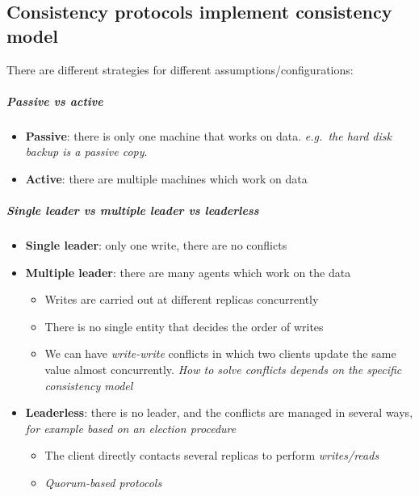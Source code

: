 \subsection{Consistency protocols implement consistency model}

There are different strategies for different assumptions/configurations:

\subparagraph{Passive vs active}

\begin{itemize}
    \item
      \textbf{Passive}: there is only one machine that works on data.
      \emph{e.g.~the hard disk backup is a passive copy}.
    \item
      \textbf{Active}: there are multiple machines which work on data
\end{itemize}

\subparagraph{Single leader vs multiple leader vs leaderless}

\begin{itemize}
    \item
      \textbf{Single leader}: only one write, there are no conflicts
      
    \item
      \textbf{Multiple leader}: there are many agents which work on the data
    \begin{itemize}
        \item
          Writes are carried out at different replicas concurrently
        \item
          There is no single entity that decides the order of writes
        \item
          We can have \emph{write-write} conflicts in which two clients update
          the same value almost concurrently. \emph{How to solve conflicts
          depends on the specific consistency model}
    \end{itemize}
    
    \item
      \textbf{Leaderless}: there is no leader, and the conflicts are managed
      in several ways, \emph{for example based on an election procedure}
    \begin{itemize}
        \item
          The client directly contacts several replicas to perform
          \emph{writes/reads}
        \item
          \emph{Quorum-based protocols}
    \end{itemize}
\end{itemize}

